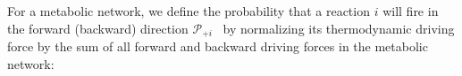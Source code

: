For a metabolic network, we define the probability that a reaction $i$ will fire in the forward (backward)  direction ${\mathcal P_{+i}}$ \ by normalizing its thermodynamic driving force by the sum of all forward and backward driving forces in the metabolic network:
